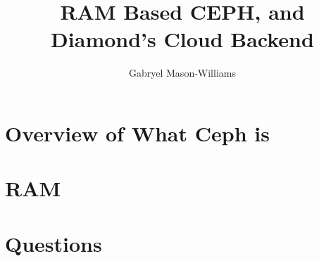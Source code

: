 \documentclass[11pt,notes]{beamer}
\title[RAM Based CEPH]{RAM Based CEPH, and Diamond’s Cloud Backend}
\author[Gabryel Mason-Williams]{Gabryel Mason-Williams}
\begin{document}


\section{Overview of What Ceph is} 


\section{RAM}


\section{Questions}

\end{document}
